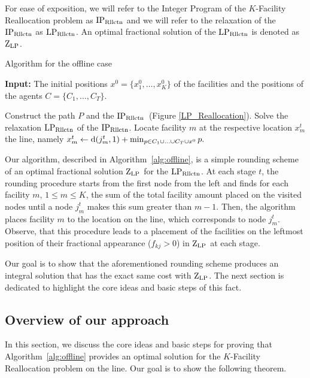 For ease of exposition, we will refer to the Integer Program of the $K$-Facility Reallocation problem as $\mathrm{IP_{\mathrm{Rllctn}}}$ and we will refer to the relaxation of the $\mathrm{IP_{\mathrm{Rllctn}}}$ as  $\mathrm{LP_{\mathrm{Rllctn}}}$. An optimal fractional solution of the $\mathrm{LP_{\mathrm{Rllctn}}}$ is denoted as $\mathrm{Z}_{\mathrm{LP}}$.


\begin{algorithm}[t]
    \caption{Algorithm for the offline case}\label{alg:offline}
    \textbf{Input:} The initial positions $x^0 = \{x_1^0,\ldots,x_K^0\}$ of the facilities and
    the positions of the agents $C = \{C_1,\ldots,C_T\}.$
    \begin{algorithmic}
        \STATE Construct the path $P$ and the $\mathrm{IP_{\mathrm{Rllctn}}}$~(Figure \ref{LP_Reallocation}).
        \STATE Solve the relaxation $\mathrm{LP_{\mathrm{Rllctn}}}$ of the $\mathrm{IP_{\mathrm{Rllctn}}}$.
                \STATE Locate facility $m$ at the respective location $x_m^t$ the 
  line, namely $x_m^t \leftarrow \mathrm{d}(j_m^t,1) + \min_{p \in C_1 \cup \ldots \cup C_T \cup x^0}
  p.$
            \ENDFOR
        \ENDFOR
    \end{algorithmic}
\end{algorithm}

Our algorithm, described in Algorithm~\ref{alg:offline}, is a simple rounding scheme of an optimal fractional solution $\mathrm{Z}_{\mathrm{LP}}$ for the $\mathrm{LP_{\mathrm{Rllctn}}}$. At each stage $t$, the rounding procedure starts from the first node from the left and
finds for each facility $m$, $1\leq m \leq K$, the sum of the total facility amount placed on the visited nodes until a node $j_m^t$ makes this sum greater than $m-1$. Then, the algorithm places facility $m$ to the location on the line, which corresponds to node $j_m^t$. Observe, that this procedure leads to a placement of the facilities on the leftmost position of their fractional appearance ($f_{kj}>0$) in $\mathrm{Z}_{\mathrm{LP}}$ at each stage.       

Our goal is to show that the aforementioned rounding scheme produces an integral solution that has the exact same cost with $\mathrm{Z}_{\mathrm{LP}}$. The next section is dedicated to highlight the core ideas and basic steps of this fact.




\subsection{Overview of our approach }
In this section, we discuss the core ideas and basic steps for proving that Algorithm~\ref{alg:offline}
provides an optimal solution for the $K$-Facility Reallocation problem on the line. Our goal is to show the following theorem. 




